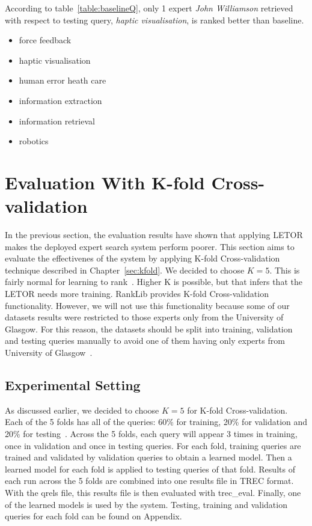 According to table~\ref{table:baselineQ}, only 1 expert \textit{John Williamson} retrieved with respect to testing query, \textit{haptic visualisation}, 
is ranked better than baseline.

\begin{itemize}
 \item force feedback
 \item haptic visualisation
 \item human error heath care
 \item information extraction
 \item information retrieval
 \item robotics
\end{itemize}

\section{Evaluation With K-fold Cross-validation}\label{sec:withLETOR}
In the previous section, the evaluation results have shown that applying LETOR makes the deployed expert search system perform poorer. 
This section aims to evaluate the effectivenes of the system by applying K-fold Cross-validation
technique described in Chapter~\ref{sec:kfold}. We decided to choose $K = 5$. This is fairly normal for learning to rank~\cite{craig}.
Higher K is possible, but that infers that the LETOR needs more training. RankLib provides K-fold Cross-validation functionality. However, we will not
use this functionality because some of our datasets results were restricted to those experts only from the University of Glasgow. For this reason, the datasets should
be split into training, validation and testing queries manually to avoid one of them having only experts from University of Glasgow~\cite{craig}.

\subsection{Experimental Setting}

As discussed earlier, we decided to choose $K = 5$ for K-fold Cross-validation. Each of the 5 folds has all of the queries: 60\% for training, 
20\% for validation and 20\% for testing~\cite{kfoldcv}. Across the 5 folds, each query will appear 3 times in training, once in validation and 
once in testing queries. For each fold, training queries are trained and validated by validation queries to obtain a learned model.
Then a learned model for each fold is applied to testing queries of that fold. Results of each run across the 5 folds are combined into one results file in
TREC format. With the qrels file, this results file is then evaluated with trec\_eval. Finally, one of the learned models is used by the system.
Testing, training and validation queries for each fold can be found on Appendix.

